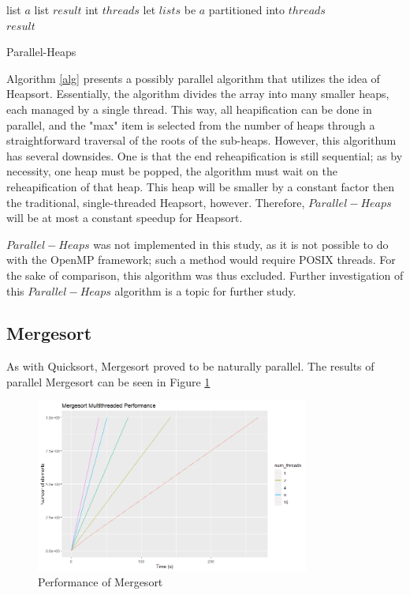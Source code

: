 \documentclass[conference]{IEEEtran}
\begin{document}
\begin{algorithm}
	\SetAlgoLined
	list $a$\;
	list $result$\;
	int $threads$\;
	let $lists$ be $a$ partitioned into $threads$\\
	\Return $result$
	\caption{Parallel-Heaps}
	\label{alg}
\end{algorithm}
Algorithm \ref{alg} presents a possibly parallel algorithm that utilizes the idea of Heapsort. 
Essentially, the algorithm divides the array into many smaller heaps, each managed by a single thread. 
This way, all heapification can be done in parallel, and the "max" item is selected from the number of heaps through a straightforward traversal of the roots of the sub-heaps. 
However, this algorithum has several downsides. 
One is that the end reheapification is still sequential; as by necessity, one heap must be popped, the algorithm must wait on the reheapification of that heap. 
This heap will be smaller by a constant factor then the traditional, single-threaded Heapsort, however. 
Therefore, $Parallel-Heaps$ will be at most a constant speedup for Heapsort.

$Parallel-Heaps$ was not implemented in this study, as it is not possible to do with the OpenMP framework; such a method would require POSIX threads. 
For the sake of comparison, this algorithm was thus excluded. 
Further investigation of this $Parallel-Heaps$ algorithm is a topic for further study.  
\subsection{Mergesort}
As with Quicksort, Mergesort proved to be naturally parallel. 
The results of parallel Mergesort can be seen in Figure \ref{ms_per}
\begin{figure}[h]
	\includegraphics[width=9cm]{ms_per.png} 
	\caption{Performance of Mergesort}
	\label{ms_per}
\end{figure}
\end{document}
